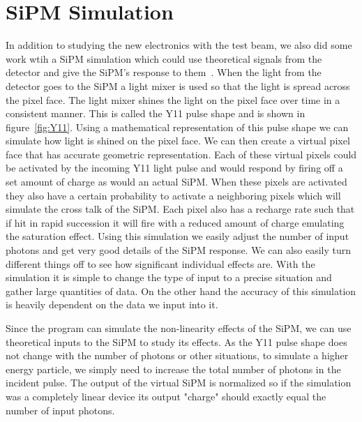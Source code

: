 \section{SiPM Simulation}

In addition to studying the new electronics with the test beam, we also did some work wtih a SiPM simulation which could use theoretical signals from the detector and give the SiPM's response to them~\cite{SiPMSimulation_github}. When the light from the detector goes to the SiPM a  light mixer is used so that the light is spread across the pixel face. The light mixer shines the light on the pixel face over time in a consistent manner. This is called the Y11 pulse shape and is shown in figure~\ref{fig:Y11}. Using a mathematical representation of this pulse shape we can simulate how light is shined on the pixel face. We can then create a virtual pixel face that has accurate geometric representation. Each of these virtual pixels could be activated by the incoming Y11 light pulse and would respond by firing off a set amount of charge as would an actual SiPM. When these pixels are activated they also have a certain probability to activate a neighboring pixels which will simulate the cross talk of the SiPM. Each pixel also has a recharge rate such that if hit in rapid succession it will fire with a reduced amount of charge emulating the saturation effect. Using this simulation we easily adjust the number of input photons and get very good details of the SiPM response. We can also easily turn different things off to see how significant individual effects are. With the simulation it is simple to change the type of input to a precise situation and gather large quantities of data. On the other hand the accuracy of this simulation is heavily dependent on the data we input into it.

Since the program can simulate the non-linearity effects of the SiPM, we can use theoretical inputs to the SiPM to study its effects. As the Y11 pulse shape does not change with the number of photons or other situations, to simulate a higher energy particle, we simply need to increase the total number of photons in the incident pulse. The output of the virtual SiPM is normalized so if the simulation was a completely linear device its output "charge" should exactly equal the number of input photons. 

